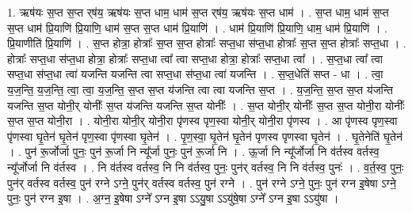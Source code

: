 \documentclass[17pt]{extarticle}
\begin{document}
1. ऋष॑यः स॒प्त स॒प्त र्‌ष॑य॒ ऋष॑यः स॒प्त धाम॒ धाम॑ स॒प्त र्‌ष॑य॒ ऋष॑यः स॒प्त धाम॑ । . स॒प्त धाम॒ धाम॑ स॒प्त स॒प्त धाम॑ प्रि॒याणि॑ प्रि॒याणि॒ धाम॑ स॒प्त स॒प्त धाम॑ प्रि॒याणि॑ । . धाम॑ प्रि॒याणि॑ प्रि॒याणि॒ धाम॒ धाम॑ प्रि॒याणि॑ । . प्रि॒याणीति॑ प्रि॒याणि॑ । . स॒प्त होत्रा॒ होत्राः᳚ स॒प्त स॒प्त होत्राः᳚ सप्त॒धा स॑प्त॒धा होत्राः᳚ स॒प्त स॒प्त होत्राः᳚ सप्त॒धा । . होत्राः᳚ सप्त॒धा स॑प्त॒धा होत्रा॒ होत्राः᳚ सप्त॒धा त्वा᳚ त्वा सप्त॒धा होत्रा॒ होत्राः᳚ सप्त॒धा त्वा᳚ । . स॒प्त॒धा त्वा᳚ त्वा सप्त॒धा स॑प्त॒धा त्वा॑ यजन्ति यजन्ति त्वा सप्त॒धा स॑प्त॒धा त्वा॑ यजन्ति । . स॒प्त॒धेति॑ सप्त - धा । . त्वा॒ य॒ज॒न्ति॒ य॒ज॒न्ति॒ त्वा॒ त्वा॒ य॒ज॒न्ति॒ स॒प्त स॒प्त य॑जन्ति त्वा त्वा यजन्ति स॒प्त । . य॒ज॒न्ति॒ स॒प्त स॒प्त य॑जन्ति यजन्ति स॒प्त योनी॒र् योनीः᳚ स॒प्त य॑जन्ति यजन्ति स॒प्त योनीः᳚ । . स॒प्त योनी॒र् योनीः᳚ स॒प्त स॒प्त योनी॒रा योनीः᳚ स॒प्त स॒प्त योनी॒रा । . योनी॒रा योनी॒र् योनी॒रा पृ॑णस्व पृण॒स्वा योनी॒र् योनी॒रा पृ॑णस्व । . आ पृ॑णस्व पृण॒स्वा पृ॑णस्वा घृ॒तेन॑ घृ॒तेन॑ पृण॒स्वा पृ॑णस्वा घृ॒तेन॑ । . पृ॒ण॒स्वा॒ घृ॒तेन॑ घृ॒तेन॑ पृणस्व पृणस्वा घृ॒तेन॑ । . घृ॒तेनेति॑ घृ॒तेन॑ । . पुन॑ रू॒र्जोर्जा पुनः॒ पुन॑ रू॒र्जा नि न्यू᳚र्जा पुनः॒ पुन॑ रू॒र्जा नि । . ऊ॒र्जा नि न्यू᳚र्जोर्जा नि व॑र्तस्व वर्तस्व॒ न्यू᳚र्जोर्जा नि व॑र्तस्व । . नि व॑र्तस्व वर्तस्व॒ नि नि व॑र्तस्व॒ पुनः॒ पुन॑र् वर्तस्व॒ नि नि व॑र्तस्व॒ पुनः॑ । . व॒र्त॒स्व॒ पुनः॒ पुन॑र् वर्तस्व वर्तस्व॒ पुन॑ रग्ने ऽग्ने॒ पुन॑र् वर्तस्व वर्तस्व॒ पुन॑ रग्ने । . पुन॑ रग्ने ऽग्ने॒ पुनः॒ पुन॑ रग्न इ॒षेषा ऽग्ने॒ पुनः॒ पुन॑ रग्न इ॒षा । . अ॒ग्न॒ इ॒षेषा ऽग्ने᳚ ऽग्न इ॒षा ऽऽयु॒षा ऽऽयु॑षे॒षा ऽग्ने᳚ ऽग्न इ॒षा ऽऽयु॑षा । \newline
\end{document}
